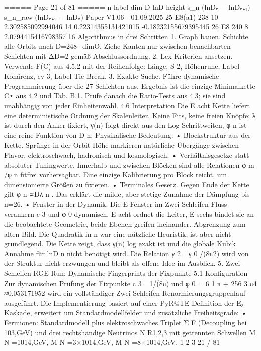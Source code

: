 \begin{MyVerbatim}
===== Page 21 of 81 =====
n label dim D lnD height s_n (lnDₙ − lnDₙ₊₁) s_n_raw (lnDₙ₊₁ − lnDₙ)
Paper V1.06 - 01.09.2025
25 E8(a1) 238 10 2.302585092994046 14 0.22314355131421015 -0.18232155679395445
26 E8 240 8 2.0794415416798357 16
Algorithmus in drei Schritten
1. Graph bauen. Schichte alle Orbits nach D=248−dimO. Ziehe Kanten nur zwischen benachbarten
Schichten mit ΔD=2 gemäß Abschlussordnung.
2. Lex-Kriterien ansetzen. Verwende F(C) aus 4.5.2 mit der Reihenfolge: Länge, S 2, Höhenruhe,
Label-Kohärenz, cv 3, Label-Tie-Break.
3. Exakte Suche. Führe dynamische Programmierung über die 27 Schichten aus. Ergebnis ist die einzige
Minimalkette C⋆ aus 4.2 und Tab. B.1.
Prüfe danach die Ratio-Tests aus 4.3; sie sind unabhängig von jeder Einheitenwahl.
4.6 Interpretation
Die E acht Kette liefert eine deterministische Ordnung der Skalenleiter. Keine Fits, keine freien Knöpfe: λ ist durch den
Anker fixiert, γ(n) folgt direkt aus den Log Schrittweiten, φ n ist eine reine Funktion von D n.
Physikalische Bedeutung.
• Blockstruktur aus der Kette. Sprünge in der Orbit Höhe markieren natürliche Übergänge zwischen Flavor,
elektroschwach, hadronisch und kosmologisch.
• Verhältnisgesetze statt absoluter Tuningwerte. Innerhalb und zwischen Blöcken sind alle Relationen φ m /φ n fitfrei
vorhersagbar. Eine einzige Kalibrierung pro Block reicht, um dimensionierte Größen zu fixieren.
• Terminales Gesetz. Gegen Ende der Kette gilt φ n ∝Dλ n . Das erklärt die milde, aber stetige Zunahme der Dämpfung bis
n=26.
• Fenster in der Dynamik. Die E Fenster im Zwei Schleifen Fluss verankern c 3 und φ 0 dynamisch. E acht ordnet die
Leiter, E sechs bindet sie an die beobachtete Geometrie, beide Ebenen greifen ineinander.
Abgrenzung zum alten Bild.
Die Quadratik in n war eine nützliche Heuristik, ist aber nicht grundlegend. Die Kette zeigt, dass γ(n) log exakt ist und die
globale Kubik Annahme für lnD n nicht benötigt wird. Die Relation γ 2 =γ 0 /(8π2) wird von der Struktur nicht erzwungen
und bleibt als offene Idee im Ausblick.
5. Zwei-Schleifen RGE-Run: Dynamische Fingerprints der Fixpunkte
5.1 Konfiguration
Zur dynamischen Prüfung der Fixpunkte c 3 =1/(8π) und φ 0 = 6 1 π + 256 3 π4 ≈0.053171952 wird ein vollständiger Zwei
Schleifen Renormierungsgruppenlauf ausgeführt. Die Implementierung basiert auf einer PyR@TE Definition der E₈
Kaskade, erweitert um Standardmodellfelder und zusätzliche Freiheitsgrade:
• Fermionen: Standardmodell plus elektroschwaches Triplet Σ F (Decoupling bei 103,GeV) und drei rechtshändige
Neutrinos N R1,2,3 mit getrennten Schwellen M N =1014,GeV, M N =3×1014,GeV, M N =8×1014,GeV.
1 2 3
21 / 81


\end{MyVerbatim}

